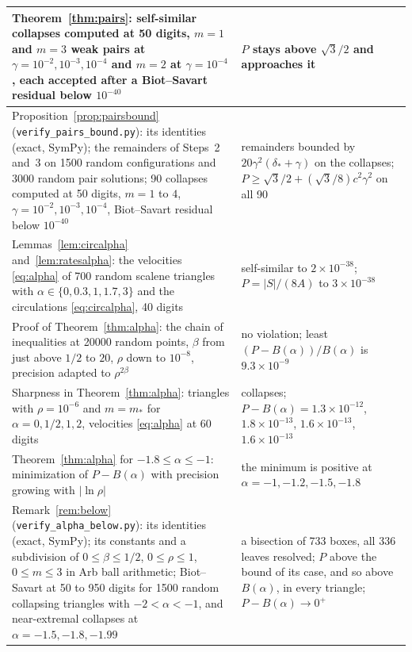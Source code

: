 \documentclass[11pt]{article}
\theoremstyle{definition}
\begin{document}
{\begin{longtable}{|>{\raggedright\arraybackslash}p{}|>{\raggedright\arraybackslash}p{}|}
  Theorem~\ref{thm:pairs}: self-similar collapses computed at 50 digits, $m = 1$ and $m = 3$ weak pairs at $\gamma = 10^{-2}, 10^{-3}, 10^{-4}$ and $m = 2$ at $\gamma = 10^{-4}$, each accepted after a Biot--Savart residual below $10^{-40}$
    & $P$ stays above $\sqrt{3}/2$ and approaches it \\ \hline
  Proposition~\ref{prop:pairsbound} (\texttt{verify\_\allowbreak pairs\_\allowbreak bound.py}): its identities (exact, SymPy); the remainders of Steps~2 and~3 on 1500 random configurations and 3000 random pair solutions; 90 collapses computed at 50 digits, $m = 1$ to $4$, $\gamma = 10^{-2}, 10^{-3}, 10^{-4}$, Biot--Savart residual below $10^{-40}$
    & remainders bounded by $20\gamma^2(\delta_* + \gamma)$ on the collapses; $P \ge \sqrt{3}/2 + (\sqrt{3}/8)c^2\gamma^2$ on all 90 \\ \hline
  Lemmas~\ref{lem:circalpha} and~\ref{lem:ratesalpha}: the velocities \eqref{eq:alpha} of 700 random scalene triangles with $\alpha \in \{0, 0.3, 1, 1.7, 3\}$ and the circulations \eqref{eq:circalpha}, 40 digits
    & self-similar to $2 \times 10^{-38}$; $P = |S|/(8A)$ to $3 \times 10^{-38}$ \\ \hline
  Proof of Theorem~\ref{thm:alpha}: the chain of inequalities at 20000 random points, $\beta$ from just above $1/2$ to $20$, $\rho$ down to $10^{-8}$, precision adapted to $\rho^{2\beta}$
    & no violation; least $(P - B(\alpha))/B(\alpha)$ is $9.3 \times 10^{-9}$ \\ \hline
  Sharpness in Theorem~\ref{thm:alpha}: triangles with $\rho = 10^{-6}$ and $m = m_*$ for $\alpha = 0, 1/2, 1, 2$, velocities \eqref{eq:alpha} at 60 digits
    & collapses; $P - B(\alpha) = 1.3 \times 10^{-12}$, $1.8 \times 10^{-13}$, $1.6 \times 10^{-13}$, $1.6 \times 10^{-13}$ \\ \hline
  Theorem~\ref{thm:alpha} for $-1.8 \le \alpha \le -1$: minimization of $P - B(\alpha)$ with precision growing with $|\ln\rho|$
    & the minimum is positive at $\alpha = -1, -1.2, -1.5, -1.8$ \\ \hline
  Remark~\ref{rem:below} (\texttt{verify\_\allowbreak alpha\_\allowbreak below.py}): its identities (exact, SymPy); its constants and a subdivision of $0 \le \beta \le 1/2$, $0 \le \rho \le 1$, $0 \le m \le 3$ in Arb ball arithmetic; Biot--Savart at 50 to 950 digits for 1500 random collapsing triangles with $-2 < \alpha < -1$, and near-extremal collapses at $\alpha = -1.5, -1.8, -1.99$
    & a bisection of 733 boxes, all 336 leaves resolved; $P$ above the bound of its case, and so above $B(\alpha)$, in every triangle; $P - B(\alpha) \to 0^+$ \\ \hline

\end{longtable}}
\end{document}
